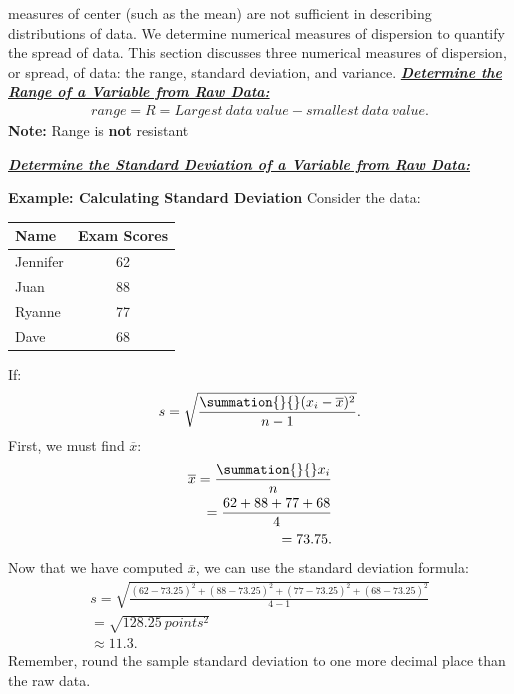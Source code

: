 \documentclass{report}
\begin{document}
        \bigbreak \noindent 
        measures of center (such as the mean) are not sufficient in describing distributions of data. We determine numerical measures of dispersion to quantify the spread of data. This section discusses three numerical measures of dispersion, or spread, of data: the range, standard deviation, and variance.
        \bigbreak \noindent \bigbreak \noindent 
        \textbf{\textit{\underline{Determine the Range of a Variable from Raw Data:}}}
        \begin{align*}
            range = R = Largest\ data\ value- smallest\ data\ value
        .\end{align*}
        \bigbreak \noindent 
        \textbf{Note:} Range is \textbf{not} resistant

        \pagebreak \bigbreak \noindent
        \textbf{\textit{\underline{Determine the Standard Deviation of a Variable from Raw Data:}}}
        \bigbreak \noindent 
        \begin{mdframed}
          \textbf{Example: Calculating Standard Deviation}
          \bigbreak \noindent 
          Consider the data:
          \begin{center}
              \begin{tabular}{|l|c|}
              \hline
            Name & Exam Scores	 \\
            \hline
            Jennifer & 62 \\  	
            \hline
            Juan & 88 \\
            \hline
            Ryanne & 77 \\
            \hline 
            Dave &  68 \\
            \hline
              \end{tabular}
          \end{center}
          \bigbreak \noindent 
          If:
          \begin{align*}
              s = \sqrt{\frac{\summation{}{}(x_{i} - \overline{x})^{2}}{n-1}}
          .\end{align*}
          \bigbreak \noindent 
          First, we must find $\overline{x}$:
          \begin{align*}
              \overline{x} = \frac{\summation{}{}x_{i}}{n} \\
              = \frac{62 + 88 + 77 + 68}{4} \\
              = 73.75
          .\end{align*}
          \bigbreak \noindent 
          Now that we have computed $\overline{x}$, we can use the standard deviation formula:
          \begin{align*}
              s = \sqrt{\frac{(62-73.25)^{2} + (88-73.25)^{2} + (77-73.25)^{2} + (68-73.25)^{2}}{4-1}} \\
              = \sqrt{128.25\ points^{2}} \\
              \approx  11.3
          .\end{align*}
          \bigbreak \noindent 
          Remember, round the sample standard deviation to one more decimal place than the raw data.

        \end{mdframed}


    
\end{document}
